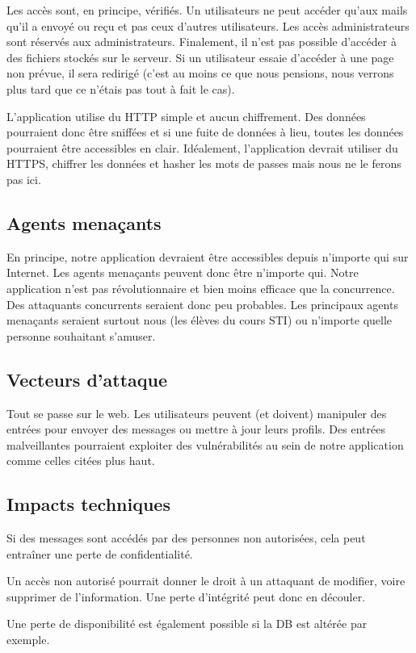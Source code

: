 \documentclass[12pt]{article}
\begin{document}
Les accès sont, en principe, vérifiés. Un utilisateurs ne peut accéder qu'aux mails qu'il a envoyé ou reçu et pas ceux d'autres utilisateurs. Les accès administrateurs sont réservés aux administrateurs. Finalement, il n'est pas possible d'accéder à des fichiers stockés sur le serveur. Si un utilisateur essaie d'accéder à une page non prévue, il sera redirigé (c'est au moins ce que nous pensions, nous verrons plus tard que ce n'étais pas tout à fait le cas).

L'application utilise du HTTP simple et aucun chiffrement. Des données pourraient donc être sniffées et si une fuite de données à lieu, toutes les données pourraient être accessibles en clair. Idéalement, l'application devrait utiliser du HTTPS, chiffrer les données et hasher les mots de passes mais nous ne le ferons pas ici.

\subsection{Agents menaçants}
En principe, notre application devraient être accessibles depuis n'importe qui sur Internet. Les agents menaçants peuvent donc être n'importe qui. Notre application n'est pas révolutionnaire et bien moins efficace que la concurrence. Des attaquants concurrents seraient donc peu probables. Les principaux agents menaçants seraient surtout nous (les élèves du cours STI) ou n'importe quelle personne souhaitant s'amuser.

\subsection{Vecteurs d'attaque}
Tout se passe sur le web. Les utilisateurs peuvent (et doivent) manipuler des entrées pour envoyer des messages ou mettre à jour leurs profils. Des entrées malveillantes pourraient exploiter des vulnérabilités au sein de notre application comme celles citées plus haut. 

\subsection{Impacts techniques}
Si des messages sont accédés par des personnes non autorisées, cela peut entraîner une perte de confidentialité.

Un accès non autorisé pourrait donner le droit à un attaquant de modifier, voire supprimer de l'information. Une perte d'intégrité peut donc en découler.

Une perte de disponibilité est également possible si la DB est altérée par exemple.
\end{document}

